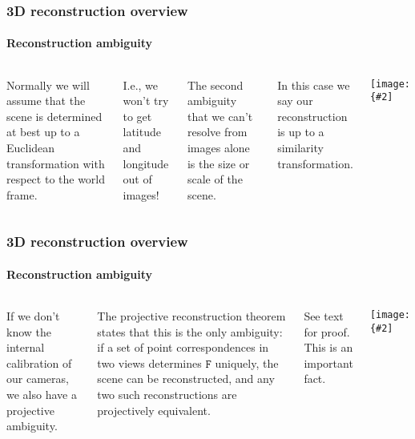 \documentclass[aspectratio=169]{beamer}
\newcommand{\mat}[1]{\mathtt{#1}}
\newcommand{\myfig}[3]{\centerline{\texttt{[image: \{\#2]}}}
    \centerline{\scriptsize #3}}
\begin{document}
\begin{frame}
\frametitle{3D reconstruction overview}
\framesubtitle{Reconstruction ambiguity}

\begin{columns}
\column{2.25in}

Normally we will assume that the scene is determined \alert{at best}
up to a \alert{Euclidean transformation} with respect to the world
frame.

\medskip

I.e., we won't try to get latitude and longitude out of images!

\medskip

The second ambiguity that we can't resolve from images alone is the
size or \alert{scale} of the scene.

\medskip

In this case we say our reconstruction is \alert{up to a similarity
  transformation}.

\column{2.25in}

\myfig{2.2in}{HZ-fig9-2a}{Hartley and Zisserman (2004), Fig.\ 10.2(a)}
\end{columns}

\end{frame}

\begin{frame}
\frametitle{3D reconstruction overview}
\framesubtitle{Reconstruction ambiguity}

\begin{columns}
\column{2.5in}

If we don't know the \alert{internal calibration} of our cameras, we
also have a \alert{projective} ambiguity.

\medskip

The \alert{projective reconstruction theorem} states that this is the
\alert{only} ambiguity: if a set of point correspondences in two views
determines $\mat{F}$ uniquely, the scene can be reconstructed, and any
two such reconstructions are \alert{projectively equivalent}.

\medskip

See text for proof.  This is an important fact.

\column{2in}

\myfig{1.9in}{HZ-fig9-2a}{Hartley and Zisserman (2004), Fig.\ 10.2(a)}
\end{columns}

\end{frame}
\end{document}
